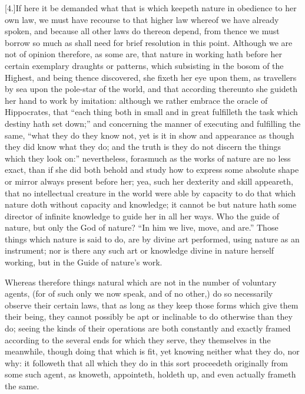 [4.]If here it be demanded what that is which keepeth nature in obedience to her own law, we must have recourse to that higher law whereof we have already spoken, and because all other laws do thereon depend, from thence we must borrow so much as shall need for brief resolution in this point. Although we are not of opinion therefore, as some are, that nature in working hath before her certain exemplary draughts or patterns, which subsisting in the bosom of the Highest, and being thence discovered, she fixeth her eye upon them, as travellers by sea upon the pole-star of the world, and that according thereunto she guideth her hand to work by imitation: although we rather embrace the oracle of Hippocrates, that “each thing both in small and in great fulfilleth the task which destiny hath set down;” and concerning the manner of executing and fulfilling the same, “what they do they know not, yet is it in show and appearance as though they did know what they do; and the truth is they do not discern the things which they look on:” nevertheless, forasmuch as the works of nature are no less exact, than if she did both behold and study how to express some absolute shape or mirror always present before her; yea, such her dexterity and skill appeareth, that no intellectual creature in the world were able by capacity to do that which nature doth without capacity and knowledge; it cannot be but nature hath some director of infinite knowledge to guide her in all her ways. Who the guide of nature, but only the God of nature? “In him we live, move, and are.” Those things which nature is said to do, are by divine art performed,  using nature as an instrument; nor is there any such art or knowledge divine in nature herself working, but in the Guide of nature’s work.

Whereas therefore things natural which are not in the number of voluntary agents, (for of such only we now speak, and of no other,) do so necessarily observe their certain laws, that as long as they keep those forms which give them their being, they cannot possibly be apt or inclinable to do otherwise than they do; seeing the kinds of their operations are both constantly and exactly framed according to the several ends for which they serve, they themselves in the meanwhile, though doing that which is fit, yet knowing neither what they do, nor why: it followeth that all which they do in this sort proceedeth originally from some such agent, as knoweth, appointeth, holdeth up, and even actually frameth the same.

